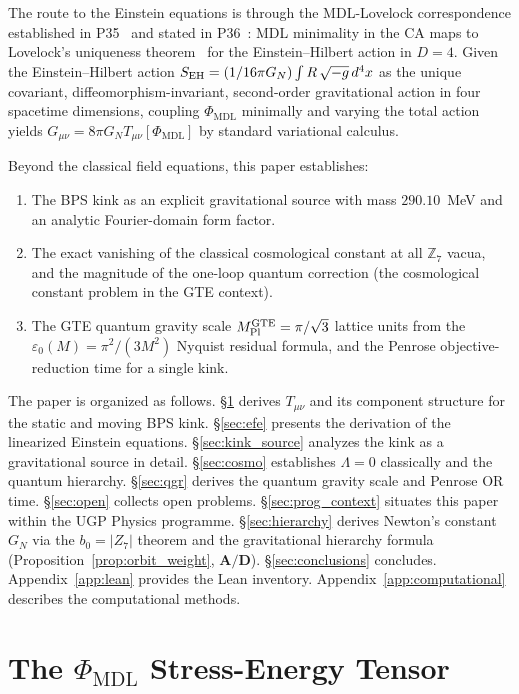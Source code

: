 \documentclass[11pt]{article}
\theoremstyle{remark}
\newcommand{\GTE}{\text{GTE}}
\newcommand{\PHIMDL}{\Phi_{\mathrm{MDL}}}
\newcommand{\ZS}{\mathbb{Z}_7}
\newcommand{\epsz}{\varepsilon_0}
\newcommand{\CatAD}{\textbf{A/D}}
\newcommand{\Tmunu}{T_{\mu\nu}}
\newcommand{\Gmunu}{G_{\mu\nu}}
\newcommand{\GN}{G_N}
\newcommand{\MPltot}{M_{\rm Pl}^{\GTE}}
\begin{document}
The route to the Einstein equations is through the MDL-Lovelock correspondence
established in P35~\cite{SpivackGTEUnification} and stated in P36~\cite{SpivackEmergentGravity}:
MDL minimality in the CA maps to Lovelock's uniqueness theorem~\cite{Lovelock1971}
for the Einstein--Hilbert action in $D=4$.
Given the Einstein--Hilbert action $S_{\rm EH} = (1/16\pi\GN)\int R\,\sqrt{-g}\,d^4x$
as the unique covariant, diffeomorphism-invariant, second-order gravitational action
in four spacetime dimensions, coupling $\PHIMDL$ minimally and varying the total
action yields $\Gmunu = 8\pi\GN\Tmunu[\PHIMDL]$ by standard variational calculus.

Beyond the classical field equations, this paper establishes:
\begin{enumerate}[leftmargin=2em,itemsep=2pt]
\item The BPS kink as an explicit gravitational source with mass $290.10$~MeV
  and an analytic Fourier-domain form factor.
\item The exact vanishing of the classical cosmological constant at all $\ZS$ vacua,
  and the magnitude of the one-loop quantum correction (the cosmological constant
  problem in the GTE context).
\item The GTE quantum gravity scale $\MPltot = \pi/\sqrt{3}$ lattice units from
  the $\epsz(M) = \pi^2/(3M^2)$ Nyquist residual formula, and the Penrose
  objective-reduction time for a single kink.
\end{enumerate}

The paper is organized as follows.
\S\ref{sec:tmunu} derives $\Tmunu$ and its component structure for the static and
moving BPS kink.
\S\ref{sec:efe} presents the derivation of the linearized Einstein equations.
\S\ref{sec:kink_source} analyzes the kink as a gravitational source in detail.
\S\ref{sec:cosmo} establishes $\Lambda = 0$ classically and the quantum hierarchy.
\S\ref{sec:qgr} derives the quantum gravity scale and Penrose OR time.
\S\ref{sec:open} collects open problems.
\S\ref{sec:prog_context} situates this paper within the UGP Physics programme.
\S\ref{sec:hierarchy} derives Newton's constant $\GN$ via the $b_0 = |Z_7|$
theorem and the gravitational hierarchy formula
(Proposition~\ref{prop:orbit_weight}, $\CatAD$).
\S\ref{sec:conclusions} concludes.
Appendix~\ref{app:lean} provides the Lean inventory.
Appendix~\ref{app:computational} describes the computational methods.

\section{The $\PHIMDL$ Stress-Energy Tensor}
\label{sec:tmunu}
\end{document}
